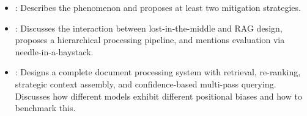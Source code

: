 \begin{interviewq}

\goodgreat
\begin{itemize}
\item {}: Describes the phenomenon and proposes at least two
  mitigation strategies.
\item {}: Discusses the interaction between lost-in-the-middle
  and RAG design, proposes a hierarchical processing pipeline, and
  mentions evaluation via needle-in-a-haystack.
\item {}: Designs a complete document processing system with
  retrieval, re-ranking, strategic context assembly, and confidence-based
  multi-pass querying.  Discusses how different models exhibit different
  positional biases and how to benchmark this.
\end{itemize}

\end{interviewq}

